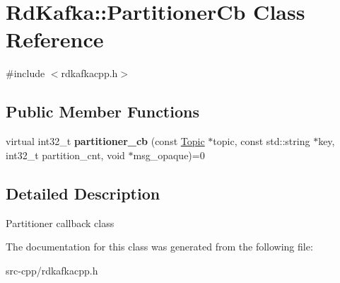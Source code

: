 \hypertarget{classRdKafka_1_1PartitionerCb}{\section{Rd\-Kafka\-:\-:Partitioner\-Cb Class Reference}
\label{classRdKafka_1_1PartitionerCb}
}


{\ttfamily \#include $<$rdkafkacpp.\-h$>$}

\subsection*{Public Member Functions}
\begin{DoxyCompactItemize}
\item 
\hypertarget{classRdKafka_1_1PartitionerCb_a44c743f829a74fe7bca5a1e931a90f82}{virtual int32\-\_\-t {\bfseries partitioner\-\_\-cb} (const \hyperlink{classRdKafka_1_1Topic}{Topic} $\ast$topic, const std\-::string $\ast$key, int32\-\_\-t partition\-\_\-cnt, void $\ast$msg\-\_\-opaque)=0}\label{classRdKafka_1_1PartitionerCb_a44c743f829a74fe7bca5a1e931a90f82}

\end{DoxyCompactItemize}


\subsection{Detailed Description}
Partitioner callback class 

The documentation for this class was generated from the following file\-:\begin{DoxyCompactItemize}
\item 
src-\/cpp/rdkafkacpp.\-h\end{DoxyCompactItemize}
